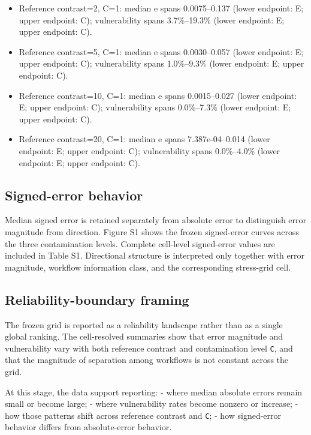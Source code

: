 \begin{itemize}
  endpoint: E; upper endpoint: C); vulnerability spans 6.3\%--36.0\%
  (lower endpoint: E; upper endpoint: C).
\item
  Reference contrast=2, C=1: median \textbar e\textbar{} spans 0.0075--0.137 (lower
  endpoint: E; upper endpoint: C); vulnerability spans 3.7\%--19.3\%
  (lower endpoint: E; upper endpoint: C).
\item
  Reference contrast=5, C=1: median \textbar e\textbar{} spans 0.0030--0.057 (lower
  endpoint: E; upper endpoint: C); vulnerability spans 1.0\%--9.3\%
  (lower endpoint: E; upper endpoint: C).
\item
  Reference contrast=10, C=1: median \textbar e\textbar{} spans 0.0015--0.027 (lower
  endpoint: E; upper endpoint: C); vulnerability spans 0.0\%--7.3\%
  (lower endpoint: E; upper endpoint: C).
\item
  Reference contrast=20, C=1: median \textbar e\textbar{} spans 7.387e-04--0.014
  (lower endpoint: E; upper endpoint: C); vulnerability spans
  0.0\%--4.0\% (lower endpoint: E; upper endpoint: C).
\end{itemize}
\fi

\subsection{Signed-error behavior}\label{signed-error-behavior}

Median signed error is retained separately from absolute error to
distinguish error magnitude from direction. Figure S1 shows the frozen
signed-error curves across the three contamination levels. Complete
cell-level signed-error values are included in Table S1. Directional
structure is interpreted only together with error magnitude, workflow
information class, and the corresponding stress-grid cell.

\subsection{Reliability-boundary
framing}\label{reliability-boundary-framing}

The frozen grid is reported as a reliability landscape rather than as a
single global ranking. The cell-resolved summaries show that error
magnitude and vulnerability vary with both reference contrast and
contamination level \texttt{C}, and that the magnitude of separation
among workflows is not constant across the grid.

At this stage, the data support reporting: - where median absolute
errors remain small or become large; - where vulnerability rates become
nonzero or increase; - how those patterns shift across
reference contrast and \texttt{C}; - how signed-error behavior differs
from absolute-error behavior.

